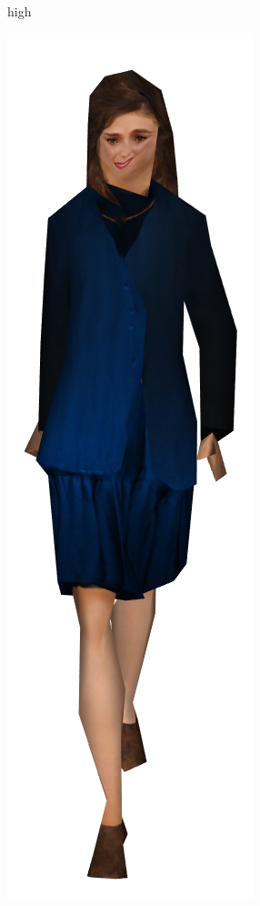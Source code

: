 \begin{figure}[h]
\begin{subfigure}[b]{.22\textwidth}
    \caption{high}
    \label{fig:womaneq1}
  \end{subfigure}
  \centering
  \begin{subfigure}[b]{.22\textwidth}
    \includegraphics[width=\textwidth]{figures/woman/equal_distance/2.png}

\end{subfigure}
\end{figure}
